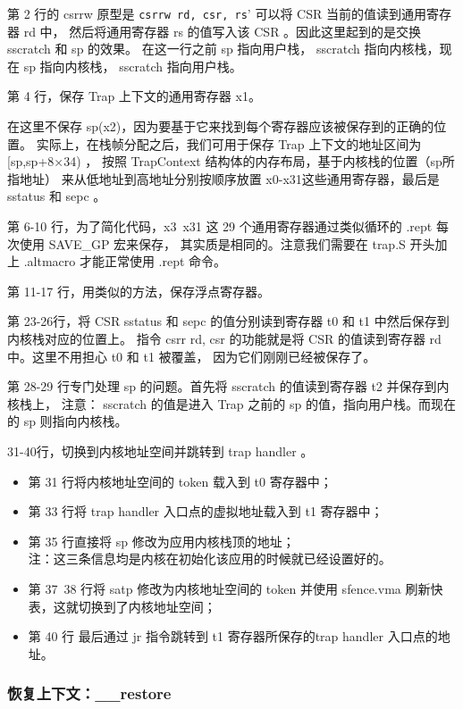 第 2 行的 csrrw 原型是 \lstinline`csrrw rd, csr, rs`' 可以将 CSR 当前的值读到通用寄存器 rd 中，
然后将通用寄存器 rs 的值写入该 CSR 。因此这里起到的是交换 sscratch 和 sp 的效果。
在这一行之前 sp 指向用户栈， sscratch 指向内核栈，现在 sp 指向内核栈， sscratch 指向用户栈。

第 4 行，保存 Trap 上下文的通用寄存器 x1。

在这里不保存 sp(x2)，因为要基于它来找到每个寄存器应该被保存到的正确的位置。
实际上，在栈帧分配之后，我们可用于保存 Trap 上下文的地址区间为 [sp,sp+8×34) ，
按照 TrapContext 结构体的内存布局，基于内核栈的位置（sp所指地址）
来从低地址到高地址分别按顺序放置 x0-x31这些通用寄存器，最后是 sstatus 和 sepc 。

第 6-10 行，为了简化代码，x3~x31 这 29 个通用寄存器通过类似循环的 .rept 每次使用 SAVE_GP 宏来保存，
其实质是相同的。注意我们需要在 trap.S 开头加上 .altmacro 才能正常使用 .rept 命令。

第 11-17 行，用类似的方法，保存浮点寄存器。

第 23-26行，将 CSR sstatus 和 sepc 的值分别读到寄存器 t0 和 t1 中然后保存到内核栈对应的位置上。
指令 csrr rd, csr 的功能就是将 CSR 的值读到寄存器 rd 中。这里不用担心 t0 和 t1 被覆盖，
因为它们刚刚已经被保存了。

第 28-29 行专门处理 sp 的问题。首先将 sscratch 的值读到寄存器 t2 并保存到内核栈上，
注意： sscratch 的值是进入 Trap 之前的 sp 的值，指向用户栈。而现在的 sp 则指向内核栈。

31-40行，切换到内核地址空间并跳转到 trap handler 。

\begin{itemize}
    \item 第 31 行将内核地址空间的 token 载入到 t0 寄存器中；
    \item 第 33 行将 trap handler 入口点的虚拟地址载入到 t1 寄存器中；
    \item 第 35 行直接将 sp 修改为应用内核栈顶的地址；\\
    注：这三条信息均是内核在初始化该应用的时候就已经设置好的。
    \item 第 37~38 行将 satp 修改为内核地址空间的 token 并使用 sfence.vma 刷新快表，这就切换到了内核地址空间；
    \item 第 40 行 最后通过 jr 指令跳转到 t1 寄存器所保存的trap handler 入口点的地址。
\end{itemize}

\subsubsection{恢复上下文：__restore}

